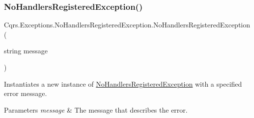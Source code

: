 \subsubsection{\texorpdfstring{No\+Handlers\+Registered\+Exception()}{NoHandlersRegisteredException()}\hspace{0.1cm}{\footnotesize\ttfamily [2/2]}}
{\footnotesize\ttfamily Cqrs.\+Exceptions.\+No\+Handlers\+Registered\+Exception.\+No\+Handlers\+Registered\+Exception (\begin{DoxyParamCaption}\item[{string}]{message }\end{DoxyParamCaption})\hspace{0.3cm}{\ttfamily [protected]}}



Instantiates a new instance of \hyperlink{classCqrs_1_1Exceptions_1_1NoHandlersRegisteredException}{No\+Handlers\+Registered\+Exception} with a specified error message. 


\begin{DoxyParams}{Parameters}
{\em message} & The message that describes the error.\\
\hline
\end{DoxyParams}
